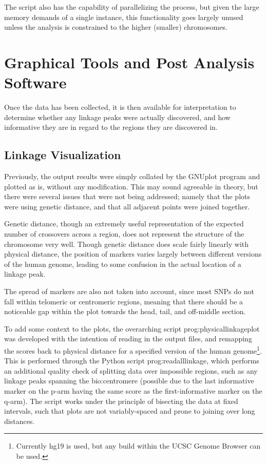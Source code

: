 The script also has the capability of parallelizing the process, but given the large memory demands of a single instance, this functionality goes largely unused unless the analysis is constrained to the higher (smaller) chromosomes.


\section{Graphical Tools and Post Analysis Software}

Once the data has been collected, it is then available for interpretation to determine whether any linkage peaks were actually discovered, and how informative they are in regard to the regions they are discovered in.

\subsection{Linkage Visualization}

Previously, the output results were simply collated by the GNUplot program and plotted as is, without any modification. This may sound agreeable in theory, but there were several issues that were not being addressed; namely that the plots were using genetic distance, and that all adjacent points were joined together.

Genetic distance, though an extremely useful representation of the expected number of crossovers across a region, does not represent the structure of the chromosome very well. Though genetic distance does scale fairly linearly with physical distance, the position of markers varies largely between different versions of the human genome, leading to some confusion in the actual location of a linkage peak.

The spread of markers are also not taken into account, since most SNPs do not fall within telomeric or centromeric regions, meaning that there should be a noticeable gap within the plot towards the head, tail, and off-middle section.

To add some context to the plots, the overarching script \gls{prog:physicallinkageplot} was developed with the intention of reading in the output files, and remapping the scores back to physical distance for a specified version of the human genome\footnote{Currently hg19 is used, but any build within the UCSC Genome Browser can be used.}. This is performed through the Python script \gls{prog:readalllinkage}, which performs an additional quality check of splitting data over impossible regions, such as any linkage peaks spanning the \gls{bio:centromere} (possible due to the last informative marker on the p-arm having the same score as the first-informative marker on the q-arm). The script works under the principle of bisecting the data at fixed intervals, such that plots are not variably-spaced and prone to joining over long distances.

